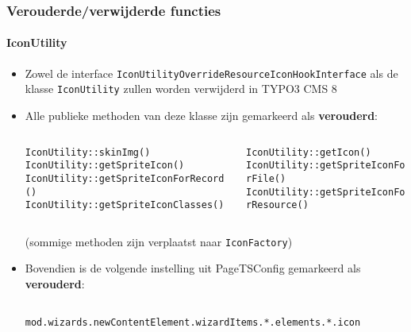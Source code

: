 \begin{frame}[fragile]
	\frametitle{Verouderde/verwijderde functies}
	\framesubtitle{IconUtility}


	\begin{itemize}

		\item Zowel de interface \texttt{IconUtilityOverrideResourceIconHookInterface}\newline
			als de klasse \texttt{IconUtility} zullen worden verwijderd in TYPO3 CMS 8

		\item Alle publieke methoden van deze klasse zijn gemarkeerd als \textbf{verouderd}:

		\vspace{0.2cm}

		\begin{columns}[T]
			\begin{column}{.5\textwidth}
				\tiny
					\tabto{1cm}\texttt{IconUtility::skinImg()}\newline
					\tabto{1cm}\texttt{IconUtility::getSpriteIcon()}\newline
					\tabto{1cm}\texttt{IconUtility::getSpriteIconForRecord()}\newline
					\tabto{1cm}\texttt{IconUtility::getSpriteIconClasses()}
			\end{column}
			\begin{column}{.5\textwidth}
				\vspace{-0.18cm}\tiny
					\texttt{IconUtility::getIcon()}\newline
					\texttt{IconUtility::getSpriteIconForFile()}\newline
					\texttt{IconUtility::getSpriteIconForResource()}\newline
			\end{column}
		\end{columns}

		\vspace{0.2cm}
		\normalsize

			\small
				(sommige methoden zijn verplaatst naar \texttt{IconFactory})
			\normalsize

		\item Bovendien is de volgende instelling uit PageTSConfig gemarkeerd als \textbf{verouderd}:

			\begin{lstlisting}
				mod.wizards.newContentElement.wizardItems.*.elements.*.icon
			\end{lstlisting}

	\end{itemize}

\end{frame}

